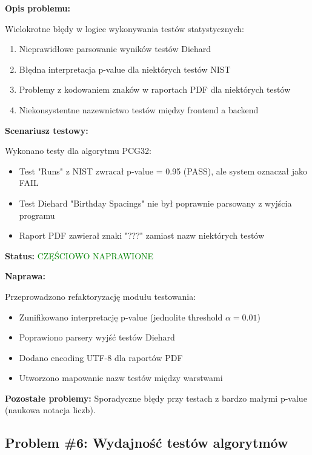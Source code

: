 \documentclass[12pt,a4paper]{article}
\begin{document}
\begin{tcolorbox}[colback=orange!10!white,colframe=orange!75!black,title=Błąd funkcjonalny - Priorytet: WYSOKI]
\textbf{Opis problemu:}

Wielokrotne błędy w logice wykonywania testów statystycznych:
\begin{enumerate}
    \item Nieprawidłowe parsowanie wyników testów Diehard
    \item Błędna interpretacja p-value dla niektórych testów NIST
    \item Problemy z kodowaniem znaków w raportach PDF dla niektórych testów
    \item Niekonsystentne nazewnictwo testów między frontend a backend
\end{enumerate}

\textbf{Scenariusz testowy:}

Wykonano testy dla algorytmu PCG32:
\begin{itemize}
    \item Test "Runs" z NIST zwracał p-value = 0.95 (PASS), ale system oznaczał jako FAIL
    \item Test Diehard "Birthday Spacings" nie był poprawnie parsowany z wyjścia programu
    \item Raport PDF zawierał znaki "???" zamiast nazw niektórych testów
\end{itemize}

\textbf{Status:} \textcolor{green}{CZĘŚCIOWO NAPRAWIONE}

\textbf{Naprawa:}

Przeprowadzono refaktoryzację modułu testowania:
\begin{itemize}
    \item Zunifikowano interpretację p-value (jednolite threshold $\alpha = 0.01$)
    \item Poprawiono parsery wyjść testów Diehard
    \item Dodano encoding UTF-8 dla raportów PDF
    \item Utworzono mapowanie nazw testów między warstwami
\end{itemize}

\textbf{Pozostałe problemy:} Sporadyczne błędy przy testach z bardzo małymi p-value (naukowa notacja liczb).
\end{tcolorbox}

\subsection{Problem \#6: Wydajność testów algorytmów}
\end{document}
